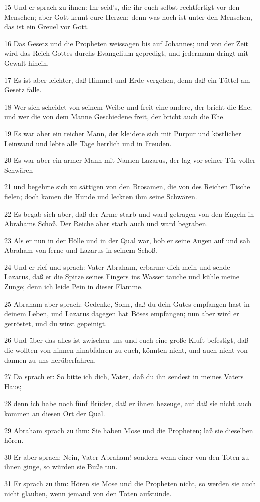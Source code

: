 \par 15 Und er sprach zu ihnen: Ihr seid's, die ihr euch selbst rechtfertigt vor den Menschen; aber Gott kennt eure Herzen; denn was hoch ist unter den Menschen, das ist ein Greuel vor Gott.
\par 16 Das Gesetz und die Propheten weissagen bis auf Johannes; und von der Zeit wird das Reich Gottes durchs Evangelium gepredigt, und jedermann dringt mit Gewalt hinein.
\par 17 Es ist aber leichter, daß Himmel und Erde vergehen, denn daß ein Tüttel am Gesetz falle.
\par 18 Wer sich scheidet von seinem Weibe und freit eine andere, der bricht die Ehe; und wer die von dem Manne Geschiedene freit, der bricht auch die Ehe.
\par 19 Es war aber ein reicher Mann, der kleidete sich mit Purpur und köstlicher Leinwand und lebte alle Tage herrlich und in Freuden.
\par 20 Es war aber ein armer Mann mit Namen Lazarus, der lag vor seiner Tür voller Schwären
\par 21 und begehrte sich zu sättigen von den Brosamen, die von des Reichen Tische fielen; doch kamen die Hunde und leckten ihm seine Schwären.
\par 22 Es begab sich aber, daß der Arme starb und ward getragen von den Engeln in Abrahams Schoß. Der Reiche aber starb auch und ward begraben.
\par 23 Als er nun in der Hölle und in der Qual war, hob er seine Augen auf und sah Abraham von ferne und Lazarus in seinem Schoß.
\par 24 Und er rief und sprach: Vater Abraham, erbarme dich mein und sende Lazarus, daß er die Spitze seines Fingers ins Wasser tauche und kühle meine Zunge; denn ich leide Pein in dieser Flamme.
\par 25 Abraham aber sprach: Gedenke, Sohn, daß du dein Gutes empfangen hast in deinem Leben, und Lazarus dagegen hat Böses empfangen; nun aber wird er getröstet, und du wirst gepeinigt.
\par 26 Und über das alles ist zwischen uns und euch eine große Kluft befestigt, daß die wollten von hinnen hinabfahren zu euch, könnten nicht, und auch nicht von dannen zu uns herüberfahren.
\par 27 Da sprach er: So bitte ich dich, Vater, daß du ihn sendest in meines Vaters Haus;
\par 28 denn ich habe noch fünf Brüder, daß er ihnen bezeuge, auf daß sie nicht auch kommen an diesen Ort der Qual.
\par 29 Abraham sprach zu ihm: Sie haben Mose und die Propheten; laß sie dieselben hören.
\par 30 Er aber sprach: Nein, Vater Abraham! sondern wenn einer von den Toten zu ihnen ginge, so würden sie Buße tun.
\par 31 Er sprach zu ihm: Hören sie Mose und die Propheten nicht, so werden sie auch nicht glauben, wenn jemand von den Toten aufstünde.

